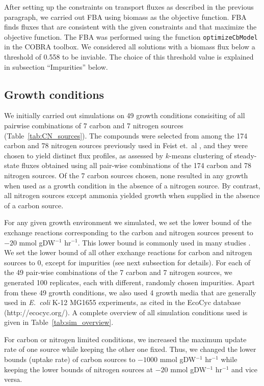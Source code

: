 \documentclass[12pt]{article}
\begin{document}
After setting up the constraints on transport fluxes as described in the previous paragraph, we carried out FBA using biomass as the objective function. FBA finds fluxes that are consistent with the given constraints and that maximize the objective function. The FBA was performed using the function \texttt{optimizeCbModel} in the COBRA toolbox. We considered all solutions with a biomass flux below a threshold of 0.558 to be inviable. The choice of this threshold value is explained in subsection ``Impurities'' below.

\subsection{Growth conditions} 
We initially carried out simulations on 49 growth conditions consisiting of all pairwise combinations of 7 carbon and 7 nitrogen sources (Table~\ref{tab:CN_sources}). The compounds were selected from among the 174 carbon and 78 nitrogen sources previously used in Feist et.\ al \cite{Feistetal2007}, and they were chosen to yield distinct flux profiles, as assessed by $k$-means clustering of steady-state fluxes obtained using all pair-wise combinations of the 174 carbon and 78 nitrogen sources. Of the 7 carbon sources chosen, none resulted in any growth when used as a growth condition in the absence of a nitrogen source. By contrast, all nitrogen sources except ammonia yielded growth when supplied in the absence of a carbon source.

For any given growth environment we simulated, we set the lower bound of the exchange reactions corresponding to the carbon and nitrogen sources present to $-20$ mmol gDW$^{-1}$ hr$^{-1}$. This lower bound is commonly used in many studies \cite{Feistetal2007}. We set the lower bound of all other exchange reactions for carbon and nitrogen sources to 0, except for impurities (see next subsection for details). For each of the 49 pair-wise combinations of the 7 carbon and 7 nitrogen sources, we generated 100 replicates, each with different, randomly chosen impurities. Apart from these 49 growth conditions, we also used 4 growth media that are generally used in \emph{E.\ coli} K-12 MG1655 experiments, as cited in the EcoCyc database (http://ecocyc.org/). A complete overview of all simulation conditions used is given in Table~\ref{tab:sim_overview}.

For carbon or nitrogen limited conditions, we increased the maximum update rate of one source while keeping the other one fixed. Thus, we changed the lower bounds (uptake rate) of carbon sources to $-1000$ mmol gDW$^{-1}$ hr$^{-1}$ while keeping the lower bounds of nitrogen sources at $-20$ mmol gDW$^{-1}$ hr$^{-1}$ and vice versa. 
\end{document}
